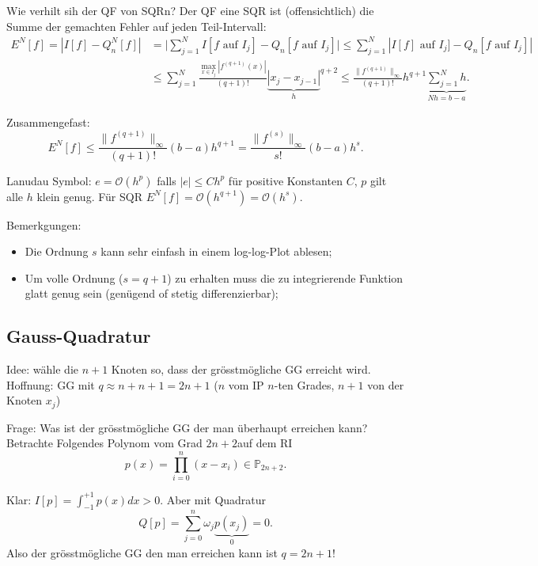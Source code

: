 \documentclass[a4paper]{article}
\begin{document}
Wie verhilt sih der QF von SQRn? Der QF eine SQR ist (offensichtlich) die
Summe der gemachten Fehler auf jeden Teil-Intervall:
\begin{align*}
  E^N[f] = | I[f] - Q_n^N[f]|
    &= \biggl| \sum_{j=1}^N
        I[f \text{ auf } I_j] - Q_n[f \text{ auf } I_j]
      \biggr|
  \leq \sum_{j=1}^N | I[f] \text{ auf } I_j] - Q_n[f \text{ auf } I_j] | \\
  &\leq \sum_{j=1}^N \frac{ \max_{x \in I_j} |f^{(q+1)}(x)| }{(q+1)!}
    {\underbrace{|x_j - x_{j-1}|}_h}^{q+2}
  \leq \frac{ \|f^{(q+1)}\|_\infty}{(q+1)!} h^{q+1}
    \underbrace{\sum_{j=1}^N h}_{Nh = b-a}.
\end{align*}

Zusammengefast:
\[
  E^N[f] \leq \frac{\| f^{(q+1)} \|_\infty}{(q+1)!} (b-a) h^{q+1}
    = \frac{\| f^{(s)} \|_\infty}{s!} (b-a) h^{s}.
\]

Lanudau Symbol: $e = \mathcal{O}(h^p)$ falls $|e| \leq C h^p$ für positive
Konstanten $C$, $p$ gilt alle $h$ klein genug. Für SQR $E^N[f] =
\mathcal{O}(h^{q+1}) = \mathcal{O}(h^s)$.

Bemerkgungen:
\begin{itemize}
  \item Die Ordnung $s$ kann sehr einfash in einem log-log-Plot ablesen;
  \item Um volle Ordnung ($s = q+1$) zu erhalten muss die zu integrierende
    Funktion glatt genug sein (genügend of stetig differenzierbar);
\end{itemize}

\subsection{Gauss-Quadratur}

Idee: wähle die $n+1$ Knoten so, dass der grösstmögliche GG erreicht wird.
Hoffnung: GG mit $q \approx n + n + 1 = 2n + 1$ ($n$ vom IP $n$-ten Grades,
$n+1$ von der Knoten $x_j$)

Frage: Was ist der grösstmögliche GG der man überhaupt erreichen kann?
Betrachte Folgendes Polynom vom Grad $2n+2$auf dem RI
\[
  p(x) = \prod_{i = 0}^n (x - x_i) \in \mathbb{P}_{2n+2}.
\]

Klar: $I[p] = \int_{-1}^{+1} p(x) dx > 0$. Aber mit Quadratur
\[
  Q[p] = \sum_{j=0}^n \omega_j \underbrace{p(x_j)}_0 = 0.
\]
Also der grösstmögliche GG den man erreichen kann ist $q = 2n + 1$!
\end{document}
